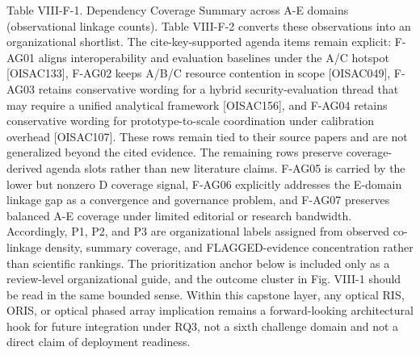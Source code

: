 {}Table VIII-F-1. Dependency Coverage Summary across A-E domains (observational linkage counts).\markdownRendererInterblockSeparator
{}\markdownRendererInterblockSeparator
{}Table VIII-F-2 converts these observations into an organizational shortlist. The cite-key-supported agenda items remain explicit: F-AG01 aligns interoperability and evaluation baselines under the A/C hotspot [O\markdownRendererUnderscore{}ISAC\markdownRendererUnderscore{}133], F-AG02 keeps A/B/C resource contention in scope [O\markdownRendererUnderscore{}ISAC\markdownRendererUnderscore{}049], F-AG03 retains conservative wording for a hybrid security-evaluation thread that may require a unified analytical framework [O\markdownRendererUnderscore{}ISAC\markdownRendererUnderscore{}156], and F-AG04 retains conservative wording for prototype-to-scale coordination under calibration overhead [O\markdownRendererUnderscore{}ISAC\markdownRendererUnderscore{}107]. These rows remain tied to their source papers and are not generalized beyond the cited evidence.\markdownRendererParagraphSeparator
{}The remaining rows preserve coverage-derived agenda slots rather than new literature claims. F-AG05 is carried by the lower but nonzero D coverage signal, F-AG06 explicitly addresses the E-domain linkage gap as a convergence and governance problem, and F-AG07 preserves balanced A-E coverage under limited editorial or research bandwidth. Accordingly, P1, P2, and P3 are organizational labels assigned from observed co-linkage density, summary coverage, and FLAGGED-evidence concentration rather than scientific rankings. The prioritization anchor below is included only as a review-level organizational guide, and the outcome cluster in Fig. VIII-1 should be read in the same bounded sense.\markdownRendererParagraphSeparator
{}Within this capstone layer, any optical RIS, ORIS, or optical phased array implication remains a forward-looking architectural hook for future integration under RQ3, not a sixth challenge domain and not a direct claim of deployment readiness.\markdownRendererParagraphSeparator
